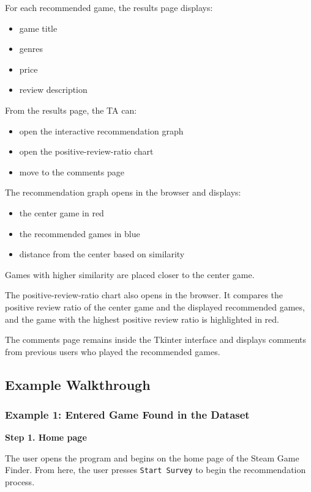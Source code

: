 \documentclass[fontsize=11pt]{article}
\begin{document}
For each recommended game, the results page displays:
\begin{itemize}
    \item game title
    \item genres
    \item price
    \item review description
\end{itemize}


From the results page, the TA can:
\begin{itemize}
    \item open the interactive recommendation graph
    \item open the positive-review-ratio chart
    \item move to the comments page
\end{itemize}

The recommendation graph opens in the browser and displays:
\begin{itemize}
    \item the center game in red
    \item the recommended games in blue
    \item distance from the center based on similarity
\end{itemize}

Games with higher similarity are placed closer to the center game.

The positive-review-ratio chart also opens in the browser. It compares the positive review ratio of the center game and the displayed recommended games, and the game with the highest positive review ratio is highlighted in red.

The comments page remains inside the Tkinter interface and displays comments from previous users who played the recommended games.

\newpage

\subsection{Example Walkthrough}

\subsubsection*{Example 1: Entered Game Found in the Dataset}

\textbf{Step 1. Home page}

The user opens the program and begins on the home page of the Steam Game Finder. From here, the user presses \texttt{Start Survey} to begin the recommendation process.
\end{document}
